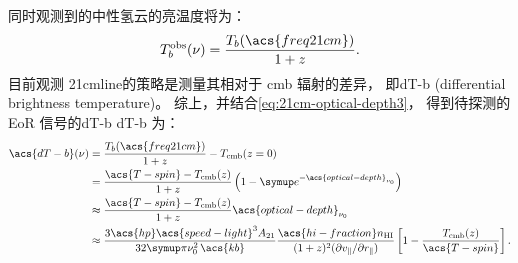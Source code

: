 同时观测到的中性氢云的亮温度将为：
\begin{equation}
  T_b^{\R{obs}}(\nu) = \frac{T_b(\acs{freq21cm})}{1 + z} .
\end{equation}
目前观测 \ac{21cmline}的策略是测量其相对于 \ac{cmb} 辐射的差异，
即\acl{dT-b} (differential brightness temperature)。
综上，并结合\autoref{eq:21cm-optical-depth3}，
得到待探测的 EoR 信号的\acl{dT-b} \ac{dT-b} 为：
\begin{align}
  \acs{dT-b}(\nu)
    & = \frac{T_b(\acs{freq21cm})}{1 + z} - T_{\R{cmb}}(z=0)  \\
    & = \frac{\acs{T-spin} - T_{\R{cmb}}(z)}{1+z}
      \left( 1 - \Ce^{-\acs{optical-depth}_{\nu_0}} \right)  \\
    & \approx \frac{\acs{T-spin} - T_{\R{cmb}}(z)}{1+z}
      \acs{optical-depth}_{\nu_0}  \\
    & \approx \frac{3 \acs{hp} \acs{speed-light}^3 A_{21}}{
      32\Cpi \nu_0^2 \,\acs{kb}}
      \frac{\acs{hi-fraction} n_{\R{HI}}}{
        (1+z)^2 (\partial v_{\parallel} / \partial r_{\parallel})}
      \left[ 1 - \frac{T_{\R{cmb}}(z)}{\acs{T-spin}} \right] .
    \label{eq:eor-signal1}
\end{align}

